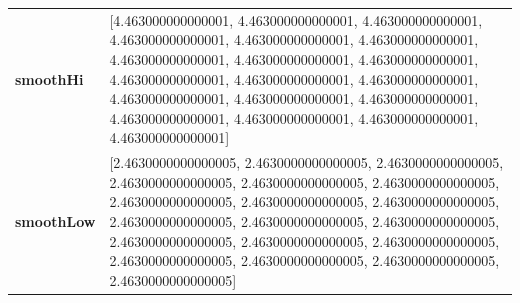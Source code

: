 		\begin{table}[H]
			\centering
			\begin{tabularx}{\textwidth}{lX}
		\textbf{smoothHi}& [4.463000000000001, 4.463000000000001, 4.463000000000001, 4.463000000000001, 4.463000000000001, 4.463000000000001, 4.463000000000001, 4.463000000000001, 4.463000000000001, 4.463000000000001, 4.463000000000001, 4.463000000000001, 4.463000000000001, 4.463000000000001, 4.463000000000001, 4.463000000000001, 4.463000000000001, 4.463000000000001, 4.463000000000001] \\
		\textbf{smoothLow} &[2.4630000000000005, 2.4630000000000005, 2.4630000000000005, 2.4630000000000005, 2.4630000000000005, 2.4630000000000005, 2.4630000000000005, 2.4630000000000005, 2.4630000000000005, 2.4630000000000005, 2.4630000000000005, 2.4630000000000005, 2.4630000000000005, 2.4630000000000005, 2.4630000000000005, 2.4630000000000005, 2.4630000000000005, 2.4630000000000005, 2.4630000000000005]\\
		
	\end{tabularx} 
\end{table}
